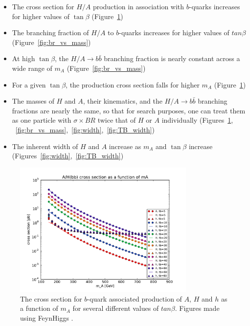 \begin{itemize}
	\item The cross section for $H/A$ production in association 
        with $b$-quarks increases for higher values of $\tan\beta$ (Figure~\ref{fig:xsec_vs_mass})
	\item The branching fraction of $H/A$ to $b$-quarks increases for higher values of $tan\beta$ (Figure~\ref{fig:br_vs_mass})
	\item At high $\tan\beta$, the $H/A\rightarrow b\bar{b}$ branching 
        fraction is nearly constant across a wide range of $m_A$ (Figure~\ref{fig:br_vs_mass})
	\item For a given $\tan\beta$, the production cross section falls for higher $m_A$ (Figure~\ref{fig:xsec_vs_mass})
	\item The masses of $H$ and $A$, their kinematics, 
        and the $H/A\rightarrow b\bar{b}$ 
        branching fractions are nearly the same, so that for search purposes, one 
        can treat them as one particle with $\sigma \times BR$ twice 
        that of $H$ or $A$ individually (Figures~\ref{fig:xsec_vs_mass},
        ~\ref{fig:br_vs_mass},~\ref{fig:width},~\ref{fig:TB_width})
	\item The inherent width of $H$ and $A$ increase as $m_A$ and $\tan\beta$ increase (Figures~\ref{fig:width},~\ref{fig:TB_width})
\end{itemize}





\begin{figure}
	\centering
	\includegraphics[width=0.8\textwidth]{Theory/figures/mssm_xsec/AH_xsec_vs_mass.pdf}
	\caption{The cross section for $b$-quark associated production of 
    $A$, $H$ and $h$ as a function of $m_A$ for several different values of $tan\beta$. 
    Figures made using FeynHiggs \cite{feynhiggs_1, feynhiggs_2, feynhiggs_3, feynhiggs_4, feynhiggs_5}.
    \label{fig:xsec_vs_mass} }
\end{figure}




